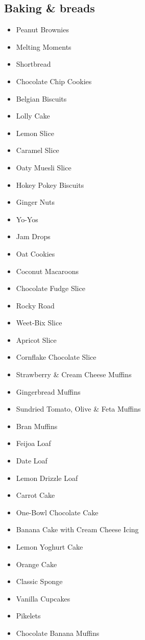 \subsection*{Baking \& breads}

\begin{itemize}
  \item \todo Peanut Brownies 
  \item \todo Melting Moments
  \item \todo Shortbread
  \item \todo Chocolate Chip Cookies
  \item \todo Belgian Biscuits
  \item \todo Lolly Cake
  \item \todo Lemon Slice
  \item \todo Caramel Slice
  \item \todo Oaty Muesli Slice
  \item \todo Hokey Pokey Biscuits
  \item \todo Ginger Nuts
  \item \todo Yo-Yos
  \item \todo Jam Drops
  \item \todo Oat Cookies
  \item \todo Coconut Macaroons
  \item \todo Chocolate Fudge Slice 
  \item \todo Rocky Road
  \item \todo Weet-Bix Slice
  \item \todo Apricot Slice
  \item \todo Cornflake Chocolate Slice
\end{itemize}

\begin{itemize}
  \item \todo Strawberry \& Cream Cheese Muffins
  \item \todo Gingerbread Muffins
  \item \todo Sundried Tomato, Olive \& Feta Muffins
  \item \todo Bran Muffins
  \item \todo Feijoa Loaf
  \item \todo Date Loaf
  \item \todo Lemon Drizzle Loaf
  \item \todo Carrot Cake
  \item \todo One-Bowl Chocolate Cake
  \item \todo Banana Cake with Cream Cheese Icing
  \item \todo Lemon Yoghurt Cake
  \item \todo Orange Cake
  \item \todo Classic Sponge
  \item \todo Vanilla Cupcakes
  \item \todo Pikelets
  \item \todo Chocolate Banana Muffins
\end{itemize}

